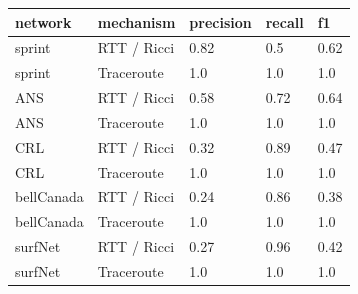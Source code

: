 \begin{tabular}{lllll}
\toprule
network & mechanism & precision & recall & f1 \\
\midrule
sprint & RTT / Ricci & 0.82 & 0.5 & 0.62 \\
sprint & Traceroute & 1.0 & 1.0 & 1.0 \\
ANS & RTT / Ricci & 0.58 & 0.72 & 0.64 \\
ANS & Traceroute & 1.0 & 1.0 & 1.0 \\
CRL & RTT / Ricci & 0.32 & 0.89 & 0.47 \\
CRL & Traceroute & 1.0 & 1.0 & 1.0 \\
bellCanada & RTT / Ricci & 0.24 & 0.86 & 0.38 \\
bellCanada & Traceroute & 1.0 & 1.0 & 1.0 \\
surfNet & RTT / Ricci & 0.27 & 0.96 & 0.42 \\
surfNet & Traceroute & 1.0 & 1.0 & 1.0 \\
\bottomrule
\end{tabular}
